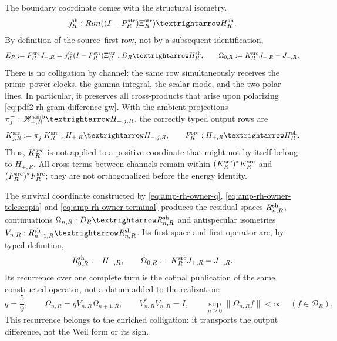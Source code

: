 The boundary coordinate comes with the structural isometry.
\[
 \jmath_R^{\rm sh}:
 \overline{\operatorname{Ran}((I-P_R^{\rm str})\Xi_R^{\rm str})}
 \longrightarrow\mathcal H_R^{\rm sh}.
\]
By definition of the source--first row, not by a subsequent identification,
\begin{equation}\label{eq:pdf2-rh-source-state-output}
 E_R:=\mathcal F_R^{\rm src}J_{+,R}
     =\jmath_R^{\rm sh}(I-P_R^{\rm str})\Xi_R^{\rm str}:
 \mathcal D_R\longrightarrow\mathcal H_R^{\rm sh},
 \qquad
 \Omega_{0,R}:=\mathcal K_R^{\rm src}J_{+,R}-J_{-,R}.
\end{equation}
There is no colligation by channel: the same row simultaneously receives the
prime--power clocks, the gamma integral, the scalar mode, and the two polar
lines. In particular, it preserves all cross-products that arise upon
polarizing \eqref{eq:pdf2-rh-gram-difference-gw}.
With the ambient projections \(\pi_j^-:\mathscr H_{-,R}^{\rm amb}
\to H_{-,j,R}\), the correctly typed output rows are
\begin{equation}\label{eq:pdf2-rh-bloques-coligacion}
 \mathcal K_{j,R}^{\rm src}
 :=\pi_j^-\mathcal K_R^{\rm src}:
 H_{+,R}\longrightarrow H_{-,j,R},
 \qquad
 \mathcal F_R^{\rm src}:H_{+,R}\longrightarrow\mathcal H_R^{\rm sh}.
\end{equation}
Thus, \(\mathcal K_R^{\rm src}\) is not applied to a positive coordinate that
might not by itself belong to \(H_{+,R}\). All cross-terms between
channels remain within
\((\mathcal K_R^{\rm src})^*\mathcal K_R^{\rm src}\) and
\((\mathcal F_R^{\rm src})^*\mathcal F_R^{\rm src}\); they are not orthogonalized
before the energy identity.

The survival coordinate constructed by
\eqref{eq:amp-rh-owner-q}, \eqref{eq:amp-rh-owner-telescopia} and
\eqref{eq:amp-rh-owner-terminal} produces the residual spaces
\(\mathcal R_{n,R}^{\rm sh}\), continuations
\(\Omega_{n,R}:\mathcal D_R\to\mathcal R_{n,R}^{\rm sh}\) and antispecular
isometries
\(V_{n,R}:\mathcal R_{n+1,R}^{\rm sh}\to\mathcal R_{n,R}^{\rm sh}\). Its
first space and first operator are, by typed definition,
\[
 \mathcal R_{0,R}^{\rm sh}:=H_{-,R},\qquad
 \Omega_{0,R}:=\mathcal K_R^{\rm src}J_{+,R}-J_{-,R}.
\]
Its recurrence over one complete turn is the cofinal publication of the same
constructed operator, not a datum added to the realization:
\begin{equation}\label{eq:pdf2-rh-recurrencia-residual}
 q=\frac59,\qquad
 \Omega_{n,R}=qV_{n,R}\Omega_{n+1,R},
 \qquad V_{n,R}^*V_{n,R}=I,
 \qquad
 \sup_{n\geq0}\|\Omega_{n,R}f\|<\infty
 \quad(f\in\mathcal D_R).
\end{equation}
This recurrence belongs to the enriched colligation: it transports the
output difference, not the Weil form or its sign.

